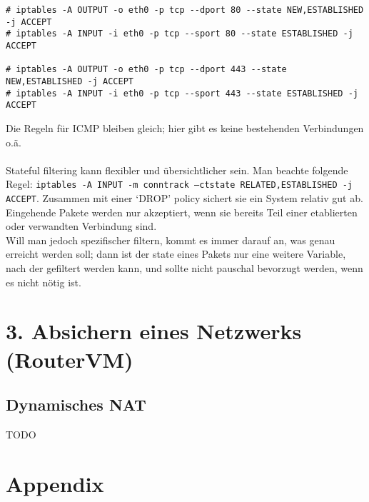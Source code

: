 \documentclass[10pt,a4paper]{article}
\begin{document}
\begin{verbatim}
# iptables -A OUTPUT -o eth0 -p tcp --dport 80 --state NEW,ESTABLISHED -j ACCEPT
# iptables -A INPUT -i eth0 -p tcp --sport 80 --state ESTABLISHED -j ACCEPT

# iptables -A OUTPUT -o eth0 -p tcp --dport 443 --state NEW,ESTABLISHED -j ACCEPT
# iptables -A INPUT -i eth0 -p tcp --sport 443 --state ESTABLISHED -j ACCEPT
\end{verbatim}

Die Regeln für ICMP bleiben gleich; hier gibt es keine bestehenden Verbindungen o.ä.
\\
\\
Stateful filtering kann flexibler und übersichtlicher sein. Man beachte folgende Regel:
\texttt{iptables -A INPUT -m conntrack --ctstate RELATED,ESTABLISHED -j ACCEPT}. Zusammen mit einer `DROP' policy
sichert sie ein System relativ gut ab. Eingehende Pakete werden nur akzeptiert, wenn sie bereits Teil einer etablierten oder verwandten
Verbindung sind.\\
Will man jedoch spezifischer filtern, kommt es immer darauf an, was genau erreicht werden soll; dann ist der state eines Pakets
nur eine weitere Variable, nach der gefiltert werden kann, und sollte nicht pauschal bevorzugt werden, wenn es nicht nötig ist.


\setcounter{section}{3}
\section*{3. Absichern eines Netzwerks (RouterVM)}
\setcounter{subsection}{0}

\subsection{Dynamisches NAT}
TODO

\newpage
\section*{Appendix}
\end{document}
